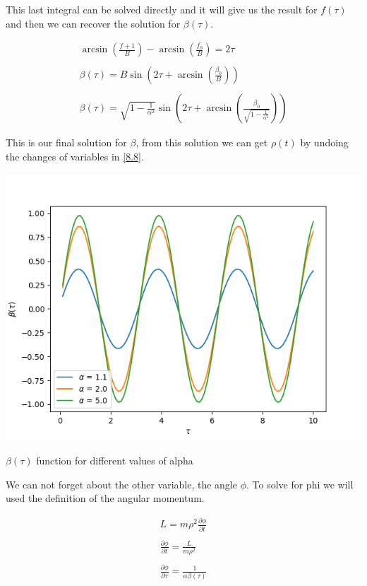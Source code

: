 This last integral can be solved directly and it will give us the result for $f(\tau)$ and then we can recover the solution for $\beta(\tau)$.

\begin{equation}
  \begin{array}{c}
    \arcsin(\frac{f+1}{B}) - \arcsin(\frac{f_0}{B}) =2\tau
    \\

    \\
    \beta(\tau) = B \sin\left(2\tau + \arcsin\left(\frac{\beta_0}{B}\right) \right)
    \\

    \\
    \beta(\tau) = \sqrt{1-\frac{1}{\alpha^2}} \sin\left(2\tau + \arcsin\left(\frac{\beta_0}{\sqrt{1-\frac{1}{\alpha^2}}}\right) \right)
  \end{array}
\end{equation}

This is our final solution for $\beta$, from this solution we can get $\rho(t)$ by undoing the changes of variables in \ref{8.8}.

\begin{marginfigure}[-2cm]
  \includegraphics{images8/beta_tau.png}
  \caption{$\beta(\tau)$ function for different values of alpha}
\end{marginfigure}

We can not forget about the other variable, the angle $\phi$. To solve for phi we will used the definition of the angular momentum.

\begin{equation}
  \begin{array}{c}
    L = m \rho^2 \frac{\partial \phi}{\partial t}
    \\

    \\
    \frac{\partial \phi}{\partial t} = \frac{L}{m \rho^2}
    \\

    \\
    \frac{\partial \phi}{\partial \tau} = \frac{1}{\alpha \beta(\tau)}
  \end{array}
\end{equation}

